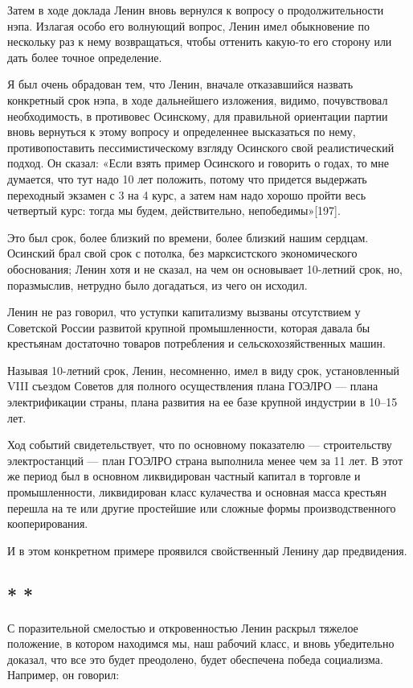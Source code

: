 \documentclass[12pt, a4paper, openany]{book}
\begin{document}
Затем в ходе доклада Ленин вновь вернулся к вопросу о продолжительности нэпа. Излагая особо его волнующий вопрос, Ленин имел обыкновение по нескольку раз к нему возвращаться, чтобы оттенить какую-то его сторону или дать более точное определение.

Я был очень обрадован тем, что Ленин, вначале отказавшийся назвать конкретный срок нэпа, в ходе дальнейшего изложения, видимо, почувствовал необходимость, в противовес Осинскому, для правильной ориентации партии вновь вернуться к этому вопросу и определеннее высказаться по нему, противопоставить пессимистическому взгляду Осинского свой реалистический подход. Он сказал: «Если взять пример Осинского и говорить о годах, то мне думается, что тут надо 10 лет положить, потому что придется выдержать переходный экзамен с 3 на 4 курс, а затем нам надо хорошо пройти весь четвертый курс: тогда мы будем, действительно, непобедимы»[197].

Это был срок, более близкий по времени, более близкий нашим сердцам. Осинский брал свой срок с потолка, без марксистского экономического обоснования; Ленин хотя и не сказал, на чем он основывает 10-летний срок, но, поразмыслив, нетрудно было догадаться, из чего он исходил.

Ленин не раз говорил, что уступки капитализму вызваны отсутствием у Советской России развитой крупной промышленности, которая давала бы крестьянам достаточно товаров потребления и сельскохозяйственных машин.

Называя 10-летний срок, Ленин, несомненно, имел в виду срок, установленный VIII съездом Советов для полного осуществления плана ГОЭЛРО — плана электрификации страны, плана развития на ее базе крупной индустрии в 10–15 лет.

Ход событий свидетельствует, что по основному показателю — строительству электростанций — план ГОЭЛРО страна выполнила менее чем за 11 лет. В этот же период был в основном ликвидирован частный капитал в торговле и промышленности, ликвидирован класс кулачества и основная масса крестьян перешла на те или другие простейшие или сложные формы производственного кооперирования.

И в этом конкретном примере проявился свойственный Ленину дар предвидения.

\subsection*{\center * * *}

С поразительной смелостью и откровенностью Ленин раскрыл тяжелое положение, в котором находимся мы, наш рабочий класс, и вновь убедительно доказал, что все это будет преодолено, будет обеспечена победа социализма. Например, он говорил:
\end{document}
